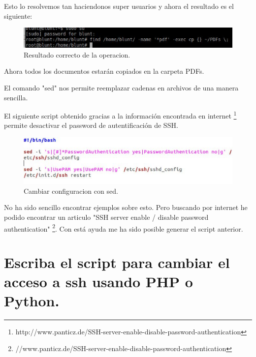 Esto lo resolvemos tan haciendonos super usuarios y ahora el resultado es el siguiente:


\begin{figure}[H]
\begin{center}
\includegraphics[scale=0.4]{Imagenes/correcta.eps}
\caption{Resultado correcto de la operacion.}
\end{center}
\end{figure}

Ahora todos los documentos estarán copiados en la carpeta PDFs.


El comando "sed" nos permite reemplazar cadenas en archivos de una manera sencilla.

El siguiente script obtenido gracias a la información encontrada en internet \footnote{http://www.panticz.de/SSH-server-enable-disable-password-authentication}
permite desactivar el password de autentificación de SSH.


\begin{figure}[H]
\begin{center}
\includegraphics[scale=0.4]{Imagenes/scriptsed.eps}
\caption{Cambiar configuracion con sed.}
\end{center}
\end{figure}

No ha sido sencillo encontrar ejemplos sobre esto. Pero buscando por internet he podido encontrar un articulo "SSH server enable / disable password authentication"  \footnote{//www.panticz.de/SSH-server-enable-disable-password-authentication}. Con está ayuda me ha sido posible generar el script anterior.


\section{ Escriba el script para cambiar el acceso a ssh usando PHP o Python.}

